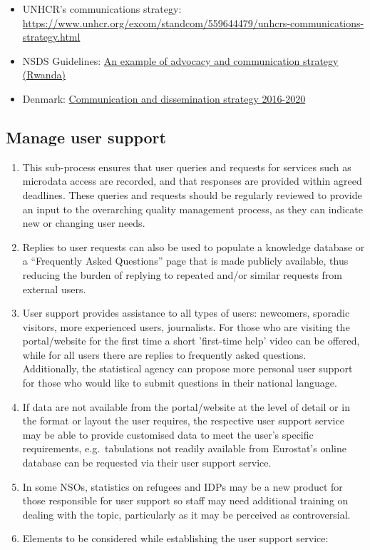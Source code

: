 \documentclass[
]{article}
\begin{document}
\begin{itemize}
\item
  UNHCR's communications strategy{:}
  \url{https://www.unhcr.org/excom/standcom/559644479/unhcrs-communications-strategy.html}
\item
  NSDS Guidelines: \href{https://nsdsguidelines.paris21.org/node/808}{An example of advocacy and communication strategy
  (Rwanda)}
\item
  Denmark: \href{https://www.dst.dk/Site/Dst/Udgivelser/GetPubFile.aspx?id=27490\&sid=comdis2016-2020}{Communication and dissemination strategy
  2016-2020}
\end{itemize}

\hypertarget{manage-user-support}{%
\subsection{Manage user support}\label{manage-user-support}}

\begin{enumerate}
\def\labelenumi{\arabic{enumi}.}
\setcounter{enumi}{530}
\item
  This sub-process ensures that user queries and requests for
  services such as microdata access are recorded, and that responses
  are provided within agreed deadlines. These queries and requests
  should be regularly reviewed to provide an input to the overarching
  quality management process, as they can indicate new or changing
  user needs.
\item
  Replies to user requests can also be used to populate a knowledge
  database or a ``Frequently Asked Questions'' page that is made
  publicly available, thus reducing the burden of replying to repeated
  and/or similar requests from external users.
\item
  User support provides assistance to all types of users: newcomers,
  sporadic visitors, more experienced users, journalists. For those
  who are visiting the portal/website for the first time a short
  'first-time help' video can be offered, while for all users there
  are replies to frequently asked questions. Additionally, the
  statistical agency can propose more personal user support for those
  who would like to submit questions in their national language.
\item
  If data are not available from the portal/website at the level of
  detail or in the format or layout the user requires, the respective
  user support service may be able to provide customised data to meet
  the user's specific requirements, e.g.~tabulations not readily
  available from Eurostat's online database can be requested via
  their user support service.
\item
  In some NSOs, statistics on refugees and IDPs may be a new product
  for those responsible for user support so staff may need additional
  training on dealing with the topic, particularly as it may be
  perceived as controversial.
\item
  Elements to be considered while establishing the user support
  service:
\end{enumerate}
\end{document}
